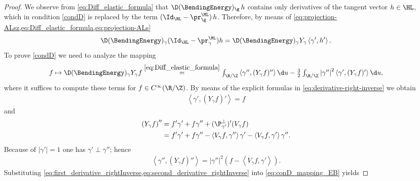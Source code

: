 \begin{proof}
We observe from \cref{eq:Diff_elastic_formula} that $\D(\BendingEnergy)_\g \, h$ contains only derivatives of the tangent vector
$h\in\HL$, which in condition \ref{condD} is replaced by
the term $(\Id_\HL-\pr_\g^\ML) \, h$.
Therefore,
by means of \cref{eq:projection-ALsz,eq:Diff_elastic_formula,eq:projection-ALs} 
\[\D(\BendingEnergy)_{\gamma}(\Id_{\HL}-\pr^{\ML}_{\gamma})h=\D(\BendingEnergy)_{\gamma}Y_{\gamma}\left\langle \gamma',h' \right\rangle.\]
To prove \ref{condD} we need to analyze the mapping
\begin{equation}\label{eq:conD_mapping_EB}
\begin{aligned}\textstyle
    f\mapsto\D(\BendingEnergy)_{\gamma}Y_\gamma f \overset{\cref{eq:Diff_elastic_formula}}{=}\int_{\R/\Z}\left\langle \gamma'',(Y_\gamma f)'' \right\rangle \d u-\frac{3}{2}\int_{\R/\Z}\left|\gamma'' \right|^2 \left\langle \gamma',(Y_\gamma f)'  \right\rangle\d u,
\end{aligned}
\end{equation}
where it suffices to compute these terms for $ f\in C^{\infty}(\R/\Z) $. By means of the explicit formulas in \cref{eq:derivative-right-inverse} we obtain
\begin{equation}
\begin{aligned}\label{eq:first_derivative_rightInverse}
    \left\langle \gamma',(Y_\gamma f)' \right\rangle =f
\end{aligned}
\end{equation}
and 
\begin{equation}\label{eq:second_derivative_rightInverse}
\begin{aligned}
    \left( Y_\gamma f \right)''&=f'\gamma'+f\gamma''+(\P^{\perp}_{\gamma'})'(V_{\gamma}f)\\
    &=f'\gamma'+f\gamma''-\left\langle V_{\gamma}f,\gamma'' \right\rangle \gamma'-\left\langle V_{\gamma}f,\gamma' \right\rangle\gamma''.
\end{aligned}
\end{equation}
Because of $ \left|\gamma' \right|=1 $ one has $ \gamma'\perp\gamma'' $; hence 
\begin{equation}\label{eq:product_second_derivative}
\begin{aligned}
    \left\langle \gamma'',(Y_\gamma f)'' \right\rangle =\left|\gamma'' \right|^2\left(f-\left\langle V_{\gamma}f,\gamma' \right\rangle \right).
\end{aligned}
\end{equation}
Substituting \cref{eq:first_derivative_rightInverse,eq:second_derivative_rightInverse} into \cref{eq:conD_mapping_EB} yields 

\end{proof}

